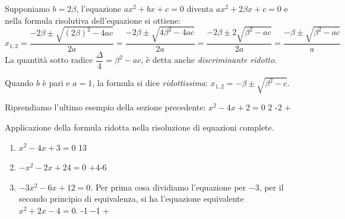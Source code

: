 Supponiamo \(b=2 \beta\), l'equazione \(a x^2 +b x +c=0\) diventa 
\(a x^2 +2 \beta x +c=0\) 
e nella formula risolutiva dell'equazione si ottiene:
\[x_{1,2}=\dfrac{-2 \beta \pm \sqrt{( 2 \beta )^2 -4ac}}{2a}=
\dfrac{-2 \beta \pm \sqrt{4\beta^{2} -4ac}}{2a}=
\dfrac{-2 \beta \pm 2 \sqrt{\beta^{2} -ac}}{2 a}=
\dfrac{-\beta \pm \sqrt{\beta^2 -ac}}{a}\]
La quantità sotto radice 
\(\dfrac{\Delta}{4} = \beta^{2} -a c\), 
è detta anche \emph{discriminante ridotto}.

Quando \(b\) è pari e \(a = 1\), la formula si dice \emph{ridottissima}: 
\(x_{1,2}=-\beta \pm \sqrt{\beta^2 -c}\).

\begin{esempio}
Riprendiamo l'ultimo esempio della sezione precedente: 
\(x^2 -4 x +2=0\)
         {2 -}{2 +}
\end{esempio}
\begin{esempio}
 Applicazione della formula ridotta nella risoluzione di equazioni complete.
\begin{enumerate}
\item \(x^2 -4x +3=0\)
         {1}{3}
\item \(-x^2 -2x +24 = 0\)
         {+4}{-6}
\item \(-3 x^2 -6 x +12=0\). Per prima cosa dividiamo l'equazione per 
\(-3\), 
per il secondo principio di equivalenza, si ha l'equazione equivalente~
\(x^2 +2x -4 = 0\). 
         {-1 -}{-1 +}
\end{enumerate}
\end{esempio}


